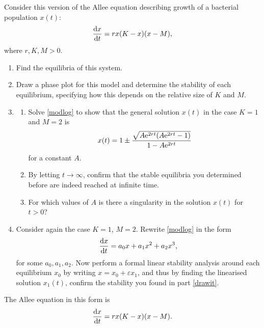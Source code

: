 \documentclass[a4paper, 12pt]{article}
\begin{document}
\begin{enumerate}[label={\bf \arabic{*}.\;}, ref={\arabic{*}},itemsep=3ex, left=0ex]
{    }


    {
      Consider this version of the Allee equation describing growth of a bacterial population $x(t)$:
      \begin{equation}
        \label{modlog}
        \fd{x}{t}= r x(K-x)(x-M),
      \end{equation}
      where $r,K,M>0$.

      \begin{enumerate}[label=(\alph{*})]
        \item Find the equilibria of this system.
        \item Draw a phase plot for this model and determine the stability of each equilibrium, specifying how this depends on the relative size of $K$ and $M$. \label{drawit}
        \item
          \begin{enumerate}[label=(\roman{*})]
            \item Solve \cref{modlog} to show that the general solution $x(t)$ in the case $K=1$ and $M=2$ is
              \begin{equation}
                x(t) = 1 \pm \frac{\sqrt{A\mathrm{e}^{2rt}(A\mathrm{e}^{2rt}-1)}}{1-A\mathrm{e}^{2rt}}
              \end{equation} for a constant $A$.
            \item By letting $t\to\infty$, confirm that the stable equilibria you determined before are indeed reached at infinite time.
            \item For which values of $A$ is there a singularity in the solution $x(t)$ for $t>0$?
          \end{enumerate}

        \item Consider again the case $K=1$, $M=2$. Rewrite \cref{modlog} in the form
          \begin{equation}
            \fd{x}{t}= a_0 x + a_1 x^2 + a_2 x^3,
          \end{equation}
          for some $a_0, a_1, a_2$. Now perform a formal linear stability analysis around each equilibrium $x_0$ by writing $x = x_0 + \varepsilon x_{1}$, and thus by finding the linearised solution $x_{1}(t)$, confirm the stability you found in part \ref{drawit}.
      \end{enumerate}
    }
    {
      The Allee equation in this form is
      \begin{equation}
        \label{modlog}
        \fd{x}{t} = r x(K-x)(x-M).
      \end{equation}
      \begin{enumerate}[label=(\alph*)]


\end{enumerate}}
\end{enumerate}
\end{document}
